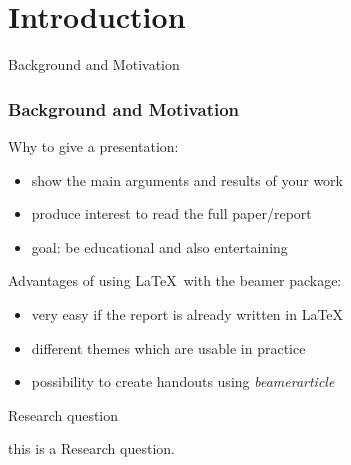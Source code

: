 \section{Introduction}
\begin{frame}{Background and Motivation}
    \frametitle<presentation>{Background and Motivation}
    \begin{block}{Why to give a presentation:}
        \begin{itemize}
            \item show the main arguments and results of your work
            \item produce interest to read the full paper/report
            \item goal: be educational and also entertaining
        \end{itemize}
    \end{block}
    \begin{block}{Advantages of using \LaTeX ~with the beamer package:}
        \begin{itemize}
            \item very easy if the report is already written in \LaTeX
            \item different themes which are usable in practice
            \item possibility to create handouts using \emph{beamerarticle}
        \end{itemize}
    \end{block}
\end{frame}

\begin{frame}{Research question}

    this is a Research question.

\end{frame}
